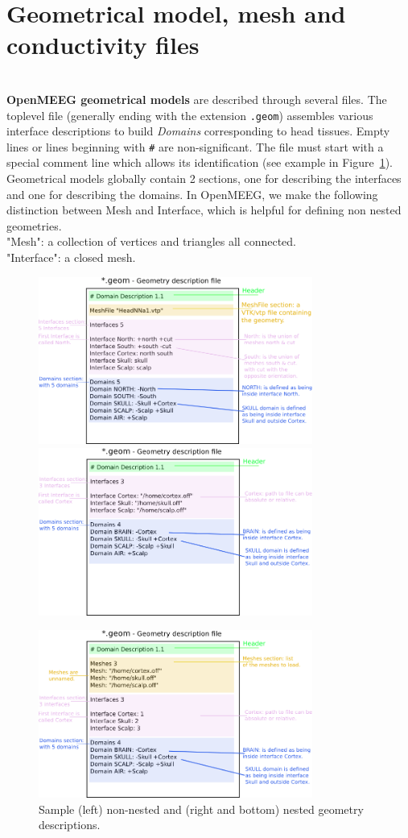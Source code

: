 \documentclass[10pt,journal]{book}
\begin{document}
    \section{Geometrical model,  mesh and conductivity files}\mbox{ }\\
    {\bf OpenMEEG geometrical models} are described through several files. The toplevel file (generally ending with the extension {\tt .geom}) assembles various
    interface descriptions to build \emph{Domains} corresponding to head tissues. Empty lines or lines beginning with {\tt \#} are non-significant.
    The file must start with a special comment line which allows its identification (see example in Figure~\ref{fig:geom}). 
    Geometrical models globally contain 2 sections, one for describing the interfaces and one for describing the domains.
    In OpenMEEG, we make the following distinction between Mesh and Interface, which is helpful for defining non nested geometries. \\
    "Mesh": a collection of vertices and triangles all connected.\\
    "Interface": a closed mesh.\\
    \begin{figure}[ht!]
    \includegraphics[width=9cm]{geom1.png}
    \includegraphics[width=9cm]{geom2.png}
\centerline{\includegraphics[width=9cm]{geom3.png}}
    \caption{Sample (left) non-nested and (right and bottom) nested geometry descriptions.}
    \label{fig:geom}
    \end{figure}
\end{document}
